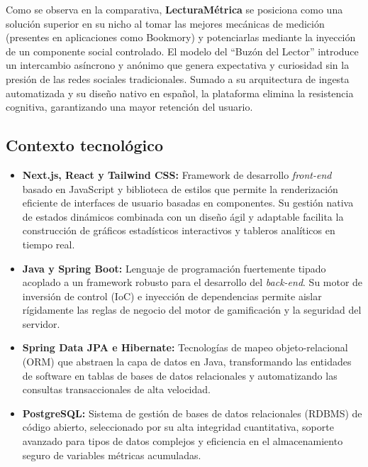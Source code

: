 \documentclass[12pt, atypical, journal]{article}
\begin{document}
Como se observa en la comparativa, \textbf{LecturaMétrica} se posiciona como una solución superior en su nicho al tomar las mejores mecánicas de medición (presentes en aplicaciones como Bookmory) y potenciarlas mediante la inyección de un componente social controlado. El modelo del ``Buzón del Lector'' introduce un intercambio asíncrono y anónimo que genera expectativa y curiosidad sin la presión de las redes sociales tradicionales. Sumado a su arquitectura de ingesta automatizada y su diseño nativo en español, la plataforma elimina la resistencia cognitiva, garantizando una mayor retención del usuario.


\subsection{Contexto tecnológico}
\begin{itemize}
   \item \textbf{Next.js, React y Tailwind CSS:} Framework de desarrollo \textit{front-end} basado en JavaScript y biblioteca de estilos que permite la renderización eficiente de interfaces de usuario basadas en componentes. Su gestión nativa de estados dinámicos combinada con un diseño ágil y adaptable facilita la construcción de gráficos estadísticos interactivos y tableros analíticos en tiempo real.
   \item \textbf{Java y Spring Boot:} Lenguaje de programación fuertemente tipado acoplado a un framework robusto para el desarrollo del \textit{back-end}. Su motor de inversión de control (IoC) e inyección de dependencias permite aislar rígidamente las reglas de negocio del motor de gamificación y la seguridad del servidor.
   \item \textbf{Spring Data JPA e Hibernate:} Tecnologías de mapeo objeto-relacional (ORM) que abstraen la capa de datos en Java, transformando las entidades de software en tablas de bases de datos relacionales y automatizando las consultas transaccionales de alta velocidad.
   \item \textbf{PostgreSQL:} Sistema de gestión de bases de datos relacionales (RDBMS) de código abierto, seleccionado por su alta integridad cuantitativa, soporte avanzado para tipos de datos complejos y eficiencia en el almacenamiento seguro de variables métricas acumuladas.
\end{itemize}

\newpage

\end{document}
